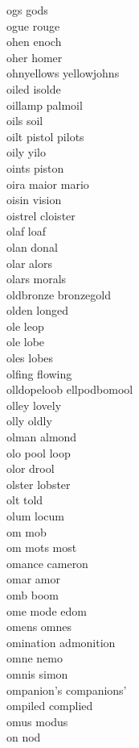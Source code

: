 ogs gods \\
ogue rouge \\
ohen enoch \\
oher homer \\
ohnyellows yellowjohns \\
oiled isolde \\
oillamp palmoil\\
oils soil\\
oilt pistol pilots  \\
oily yilo\\
oints piston \\
oira maior mario \\
oisin vision \\
oistrel cloister \\
olaf loaf\\
olan donal \\
olar alors \\
olars morals \\
oldbronze bronzegold \\
olden longed \\
ole leop \\
ole lobe \\
oles lobes \\
olfing flowing \\
olldopeloob ellpodbomool \\
olley lovely \\
olly oldly \\
olman almond \\
olo pool loop \\
olor drool \\
olster lobster \\
olt told \\
olum locum \\
om mob \\
om mots most  \\
omance cameron \\
omar amor\\
omb boom \\
ome mode edom \\
omens omnes\\
omination admonition \\
omne nemo\\
omnis simon\\
ompanion's companions' \\
ompiled complied \\
omus modus \\
on nod \\
